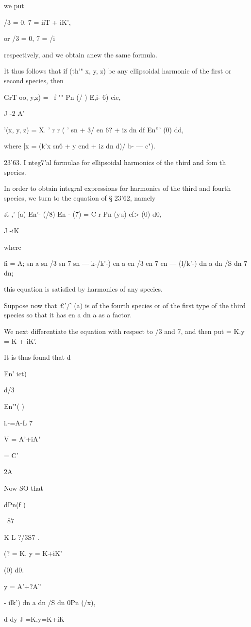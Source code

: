 {{{{{{{{we put

/3 = 0, 7 = iiT + iK',

or /3 = 0, 7 = /i

respectively, and we obtain anew the same formula.

It thus follows that if (th'" x, y, z) be any ellipsoidal harmonic of
the first or second species, then

GrT oo, y,z) = \ f "" Pn (/ ) E,i- 6) cie,

J -2 A'

  '(x, y, z) = X. ' r r ( ' sn + 3/ en 6? + iz dn df En''' (0) dd,

where [x = (k'x sn6 + y end + iz dn d)/\/ b- — c").

23'63. I nteg7'al formulae for ellipsoidal harmonics of the third and
fom th species.

In order to obtain integral expressions for harmonics of the third and
fourth species, we turn to the equation of § 23'62, namely

£ ,' (a) En'- (/8) En - (7) = C r Pn (yu) cf> (0) d0,

J -iK

where

fi = A; sn a sn /3 sn 7 sn — k-/k'-) en a en /3 en 7 en — (l/k'-) dn a
dn /S dn 7 dn;

this equation is satisfied by harmonics of any species.

Suppose now that £'/' (a) is of the fourth species or of the first
type of the third species so that it has en a dn a as a factor.

We next differentiate the equation with respect to /3 and 7, and then
put = K,y = K + iK'.

It is thus found that d

En' ict)

d/3

En'"( )

i.-=A-L 7

V = A'+iA"

= C'

2A

Now SO that

dPn(f )

\ 87 \

K L ?/3S7 .

(? = K, y = K+iK'

(0) d0.

y = A'+?A''

- ilk') dn a dn /S dn 0Pn (/x),

d dy J =K,y=K+iK

}}}}}}}}
